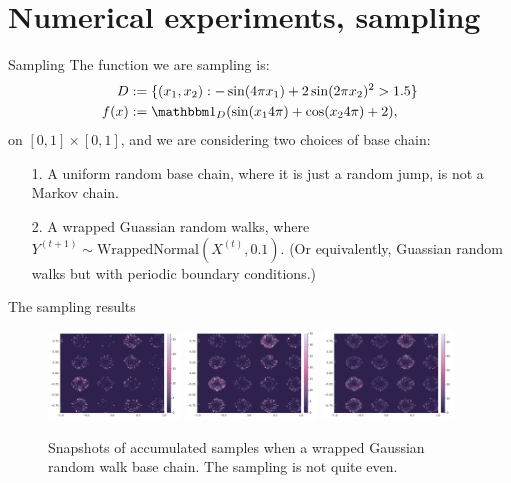 \documentclass[11pt]{beamer}
\begin{document}
\section{Numerical experiments, sampling}
    \begin{frame}{Sampling}
        The function we are sampling is: 
        \begin{align*}
            D &:= \{(x_1, x_2): -\sin(4\pi x_1) + 2\sin(2\pi x_2)^2 > 1.5\}
            \\
            f(x) &:= \mathbbm 1_D (\sin(x_14\pi) + \cos(x_24\pi) + 2), 
        \end{align*}
        on $[0, 1]\times [0, 1]$, and we are considering two choices of base chain: 
        \begin{itemize}
            \item [1.] A uniform random base chain, where it is just a random jump, is not a Markov chain. 
            \item [2.] A wrapped Guassian random walks, where $Y^{(t + 1)} \sim \text{WrappedNormal}(X^{(t)}, 0.1)$. (Or equivalently, Guassian random walks but with periodic boundary conditions.)
        \end{itemize}
    \end{frame}
    \begin{frame}{The sampling results}
        \begin{figure}
            \centering
            \includegraphics[width=3.5cm]{gaussian_base(1).png}
            \includegraphics[width=3.5cm]{gaussian_base(2).png}
            \includegraphics[width=3.5cm]{gaussian_base(3).png}
            \caption{Snapshots of accumulated samples when a wrapped Gaussian random walk base chain. The sampling is not quite even. }
            \label{fig:gaussian_rand_bc}
        \end{figure}
    \end{frame}
\end{document}
